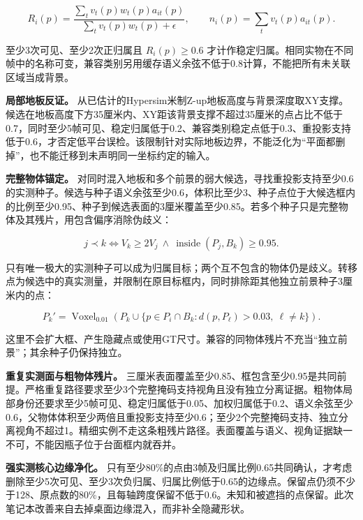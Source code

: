 \documentclass[UTF8,fontset=fandol]{ctexart}
\begin{document}
\[
R_i(p)=\frac{\sum_t v_t(p)w_t(p)a_{it}(p)}{\sum_t v_t(p)w_t(p)+\epsilon},\qquad
n_i(p)=\sum_t v_t(p)a_{it}(p).
\]

至少3次可见、至少2次正归属且 $R_i(p)\ge0.6$ 才计作稳定归属。相同实物在不同帧中的名称可变，兼容类别另用缓存语义余弦不低于0.8计算，不能把所有未关联区域当成背景。



\textbf{局部地板反证。} 从已估计的Hypersim米制Z-up地板高度与背景深度取XY支撑。候选在地板高度下方35厘米内、XY距该背景支撑不超过35厘米的点占比不低于0.7，同时至少5帧可见、稳定归属低于0.2、兼容类别稳定点低于0.3、重投影支持低于0.6，才否定低平台误检。该限制针对实际地板边界，不能泛化为“平面都删掉”，也不能迁移到未声明同一坐标约定的输入。



\textbf{完整物体锚定。} 对同时混入地板和多个前景的弱大候选，寻找重投影支持至少0.6的实测种子。候选与种子语义余弦至少0.6，体积比至少3、种子点位于大候选框内的比例至少0.95、种子到候选表面的3厘米覆盖至少0.85。若多个种子只是完整物体及其残片，用包含偏序消除伪歧义：



\[
j\prec k\iff V_k\ge2V_j\ \land\ \operatorname{inside}(P_j,B_k)\ge0.95.
\]

只有唯一极大的实测种子可以成为归属目标；两个互不包含的物体仍是歧义。转移点为候选中的真实测量，并限制在原目标框内，同时排除距其他独立前景种子3厘米内的点：



\[
P_k'=\operatorname{Voxel}_{0.01}\left(P_k\cup\{p\in P_i\cap B_k:d(p,P_\ell)>0.03,\ \ell\ne k\}\right).
\]

这里不会扩大框、产生隐藏点或使用GT尺寸。兼容的同物体残片不充当“独立前景”；其余种子仍保持独立。



\textbf{重复实测面与粗物体残片。} 三厘米表面覆盖至少0.85、框包含至少0.95是共同前提。严格重复路径要求至少3个完整掩码支持视角且没有独立分离证据。粗物体局部身份还要求至少5帧可见、稳定归属低于0.05、加权归属低于0.2、语义余弦至少0.6，父物体体积至少两倍且重投影支持至少0.6；至少2个完整掩码支持、独立分离视角不超过1。精细实例不走这条粗残片路径。表面覆盖与语义、视角证据缺一不可，不能因瓶子位于台面框内就吞并。



\textbf{强实测核心边缘净化。} 只有至少80\%的点由3帧及归属比例0.65共同确认，才考虑删除至少5次可见、至少3次负归属、归属比例低于0.65的边缘点。保留点仍须不少于128、原点数的80\%，且每轴跨度保留不低于0.6。未知和被遮挡的点保留。此次笔记本改善来自去掉桌面边缘混入，而非补全隐藏形状。
\end{document}
